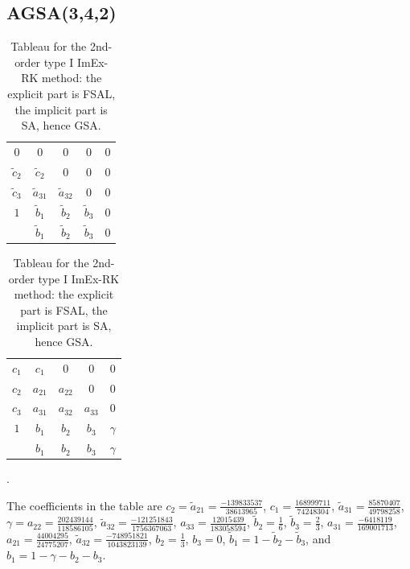 \documentclass{article}
\begin{document}
\subsection{AGSA(3,4,2)}
\begin{table}[H]
\centering
\begin{tabular}{c|cccc}
    $0$ & $0$ & $0$ & $0$ & $0$ \\
    $\tilde{c}_2$ & $\tilde{c}_2$ & $0$ & $0$ & $0$ \\
    $\tilde{c}_3$ & $\tilde{a}_{31}$ & $\tilde{a}_{32}$ & $0$ & $0$ \\
    $1$ & $\tilde{b}_1$ & $\tilde{b}_2$ & $\tilde{b}_3$ & $0$ \\
    \hline
    & $\tilde{b}_1$ & $\tilde{b}_2$ & $\tilde{b}_3$ & $0$ \\
\end{tabular}
\quad
\begin{tabular}{c|cccc}
    $c_1$ & $c_1$ & $0$ & $0$ & $0$ \\
    $c_2$ & $a_{21}$ & $a_{22}$ & $0$ & $0$ \\
    $c_3$ & $a_{31}$ & $a_{32}$ & $a_{33}$ & $0$ \\
    $1$ & $b_1$ & $b_2$ & $b_3$ & $\gamma$ \\
    \hline
     & $b_1$ & $b_2$ & $b_3$ & $\gamma$ \\
\end{tabular} \;.
\caption{Tableau for the 2nd-order type I ImEx-RK method: the explicit part is FSAL, the implicit part is SA, hence GSA.}
\label{tab:AGSA342}
\end{table}

The coefficients in the table are
$c_2 = \tilde{a}_{21} = \frac{-139833537}{38613965}$,
$c_1 = \frac{168999711}{74248304}$,
$\tilde{a}_{31} = \frac{85870407}{49798258}$,
$\gamma = a_{22} = \frac{202439144}{118586105}$,
$\tilde{a}_{32} = \frac{-121251843}{1756367063}$,
$a_{33} = \frac{12015439}{183058594}$,
$\tilde{b}_2 = \frac{1}{6}$,
$\tilde{b}_3 = \frac{2}{3}$,
$a_{31} = \frac{-6418119}{169001713}$,
$a_{21} = \frac{44004295}{24775207}$,
$\tilde{a}_{32} = \frac{-748951821}{1043823139}$,
$b_2 = \frac{1}{3}$,
$b_3 = 0$,
$\tilde{b}_1 = 1 - \tilde{b}_2 - \tilde{b}_3$,
and
$b_1 = 1 - \gamma - b_2 - b_3$.

\end{document}
